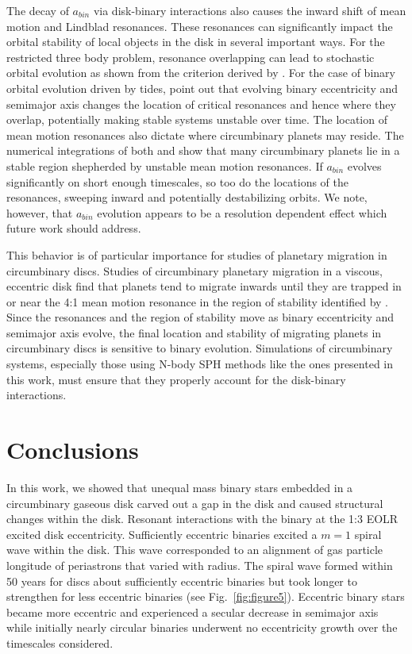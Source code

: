 The decay of $a_{bin}$ via disk-binary interactions also causes the inward shift of mean motion and Lindblad resonances.  These resonances can significantly 
impact the orbital stability of local objects in the disk in several important ways.  For the restricted three body problem, resonance overlapping can lead to 
stochastic orbital evolution as shown from the criterion derived by \citet{Wisdom80}.  For the case of binary orbital evolution driven by tides, \citet{Bromley2015} 
point out that evolving binary eccentricity and semimajor axis changes the location of critical resonances and hence where they overlap, potentially making 
stable systems unstable over time.  The location of mean motion resonances also dictate where circumbinary planets may reside.  The numerical integrations 
of both \citet{Popova13} and \citet{Chavez2015} show that many circumbinary planets lie in a stable region shepherded by unstable mean motion resonances.  If 
$a_{bin}$ evolves significantly on short enough timescales, so too do the locations of the resonances, sweeping inward and potentially destabilizing orbits.  
We note, however, that $a_{bin}$ evolution appears to be a resolution dependent effect which future work should address.

This behavior is of particular importance for studies of planetary migration in circumbinary discs.  Studies of circumbinary planetary migration in a viscous, 
eccentric disk find that planets tend to migrate inwards until they are trapped in or near the 4:1 mean motion resonance in the region of stability identified by 
\citet{Holman1999} \citep{Nelson03,Kley2014}.  Since the resonances and the region of stability move as binary eccentricity and semimajor axis evolve, the 
final location and stability of migrating planets in circumbinary discs is sensitive to binary evolution.  Simulations of circumbinary systems, especially those 
using N-body SPH methods like the ones presented in this work, must ensure that they properly account for the disk-binary interactions.

\section{Conclusions}

In this work, we showed that unequal mass binary stars embedded in a circumbinary gaseous disk carved out a gap in the disk and caused structural changes 
within the disk.  Resonant interactions with the binary at the 1:3 EOLR excited disk eccentricity.  Sufficiently eccentric binaries excited a $m = 1$ spiral 
wave within the disk.  This wave corresponded to an alignment of gas particle longitude of periastrons that varied with radius.  The spiral wave formed within 50 
years for discs about sufficiently eccentric binaries but took longer to strengthen for less eccentric binaries (see Fig.~\ref{fig:figure5}).  Eccentric binary stars 
became more eccentric and experienced a secular decrease in semimajor axis while initially nearly circular binaries underwent no eccentricity growth over the 
timescales considered.


